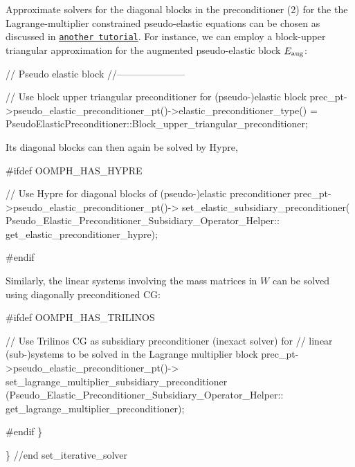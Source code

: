 Approximate solvers for the diagonal blocks in the preconditioner (2) for the the Lagrange-\/multiplier constrained pseudo-\/elastic equations can be chosen as discussed in \href{../../prescribed_displ_lagr_mult/html/index.html}{\tt another tutorial}. For instance, we can employ a block-\/upper triangular approximation for the augmented pseudo-\/elastic block $E_{\rm aug}$\+:


\begin{DoxyCodeInclude}

   \textcolor{comment}{// Pseudo elastic block}
   \textcolor{comment}{//---------------------}

   \textcolor{comment}{// Use block upper triangular preconditioner for (pseudo-)elastic block}
   prec\_pt->pseudo\_elastic\_preconditioner\_pt()->elastic\_preconditioner\_type()
    = PseudoElasticPreconditioner::Block\_upper\_triangular\_preconditioner;

\end{DoxyCodeInclude}


Its diagonal blocks can then again be solved by Hypre,


\begin{DoxyCodeInclude}

\textcolor{preprocessor}{#ifdef OOMPH\_HAS\_HYPRE}

   \textcolor{comment}{// Use Hypre for diagonal blocks of (pseudo-)elastic preconditioner}
   prec\_pt->pseudo\_elastic\_preconditioner\_pt()->
    set\_elastic\_subsidiary\_preconditioner(
     Pseudo\_Elastic\_Preconditioner\_Subsidiary\_Operator\_Helper::
     get\_elastic\_preconditioner\_hypre);

\textcolor{preprocessor}{#endif}

\end{DoxyCodeInclude}


Similarly, the linear systems involving the mass matrices in $ W $ can be solved using diagonally preconditioned CG\+:


\begin{DoxyCodeInclude}
   
\textcolor{preprocessor}{#ifdef OOMPH\_HAS\_TRILINOS}

   \textcolor{comment}{// Use Trilinos CG as subsidiary preconditioner (inexact solver) for}
   \textcolor{comment}{// linear (sub-)systems to be solved in the Lagrange multiplier block}
   prec\_pt->pseudo\_elastic\_preconditioner\_pt()->
    set\_lagrange\_multiplier\_subsidiary\_preconditioner
    (Pseudo\_Elastic\_Preconditioner\_Subsidiary\_Operator\_Helper::
     get\_lagrange\_multiplier\_preconditioner);

\textcolor{preprocessor}{#endif}
  \}

\} \textcolor{comment}{//end set\_iterative\_solver}

\end{DoxyCodeInclude}




